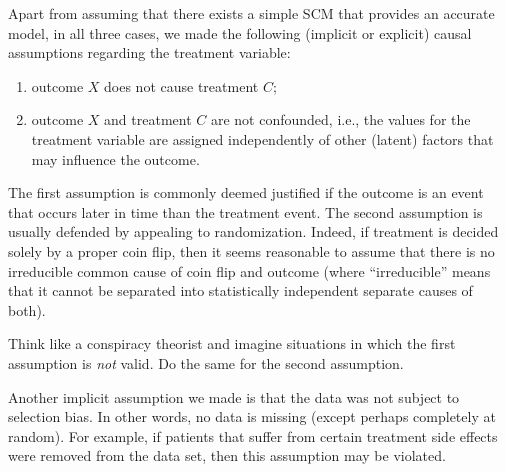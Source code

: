 Apart from assuming that there exists a simple SCM that provides an accurate model,
in all three cases, we made the following (implicit or explicit) causal assumptions regarding 
the treatment variable:
\begin{enumerate}
  \item outcome $X$ does not cause treatment $C$;
  \item outcome $X$ and treatment $C$ are not confounded, i.e., the values for
   the treatment variable are assigned independently of other (latent) factors that may influence
   the outcome.
\end{enumerate}
The first assumption is commonly deemed justified if the outcome is an event that occurs later in time than the treatment event.
The second assumption is usually defended by appealing to randomization.
Indeed, if treatment is decided solely by a proper coin flip, 
then it seems reasonable to assume that there is no irreducible common cause of coin 
flip and outcome (where ``irreducible'' means that it cannot be separated into 
statistically independent separate causes of both).
\begin{Exc}
  Think like a conspiracy theorist and imagine situations in which the first
  assumption is \emph{not} valid. Do the same for the second assumption.
\end{Exc}

Another implicit assumption we made is that the data was not subject to selection 
bias. In other words, no data is missing (except perhaps completely at random). 
For example, if patients that suffer from certain treatment side effects were
removed from the data set, then this assumption may be violated.

